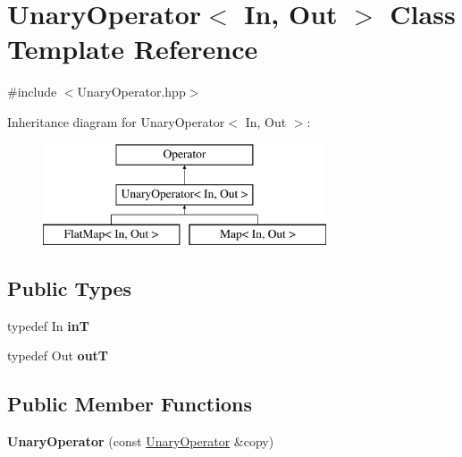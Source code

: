 \hypertarget{class_unary_operator}{\section{\-Unary\-Operator$<$ \-In, \-Out $>$ \-Class \-Template \-Reference}
\label{class_unary_operator}
}


{\ttfamily \#include $<$\-Unary\-Operator.\-hpp$>$}

\-Inheritance diagram for \-Unary\-Operator$<$ \-In, \-Out $>$\-:\begin{figure}[H]
\begin{center}
\leavevmode
\includegraphics[height=3.000000cm]{class_unary_operator}
\end{center}
\end{figure}
\subsection*{\-Public \-Types}
\begin{DoxyCompactItemize}
\item 
\hypertarget{class_unary_operator_ad5c2571562954f8e0197da4592d23b8d}{typedef \-In {\bfseries in\-T}}\label{class_unary_operator_ad5c2571562954f8e0197da4592d23b8d}

\item 
\hypertarget{class_unary_operator_ad939e9408cfcf42963dbd3c4c314bc4c}{typedef \-Out {\bfseries out\-T}}\label{class_unary_operator_ad939e9408cfcf42963dbd3c4c314bc4c}

\end{DoxyCompactItemize}
\subsection*{\-Public \-Member \-Functions}
\begin{DoxyCompactItemize}
\item 
\hypertarget{class_unary_operator_a3193274926860f4ef1f9d7bd47cfb67e}{{\bfseries \-Unary\-Operator} (const \hyperlink{class_unary_operator}{\-Unary\-Operator} \&copy)}\label{class_unary_operator_a3193274926860f4ef1f9d7bd47cfb67e}

\end{DoxyCompactItemize}
